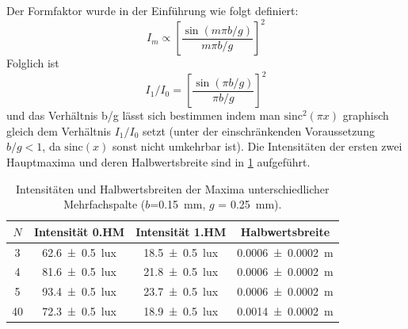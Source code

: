 \documentclass[
	a4paper,
	12pt,
	pagesize,
	ngerman
]{scrartcl}
\begin{document}
	

	
	Der Formfaktor wurde in der Einführung wie folgt definiert: 
	\begin{equation}
		I_m \propto \left[\frac{\sin(m\pi b/g)}{m\pi b/g}\right]^2
	\end{equation}
	Folglich ist
	\begin{equation}
		I_1/I_0 = \left[\frac{\sin(\pi b/g)}{\pi b/g}\right]^2
	\end{equation}
	und das Verhältnis b/g lässt sich bestimmen indem man $ \text{sinc}^2(\pi x)$ graphisch gleich dem Verhältnis $I_1/I_0$ setzt (unter der einschränkenden Voraussetzung $b/g<1$, da $\text{sinc}(x)$ sonst nicht umkehrbar ist).
	Die Intensitäten der ersten zwei Hauptmaxima und deren Halbwertsbreite sind in \cref{GitterTabelle} aufgeführt. 
	\begin{table}[H]
		\centering
		\begin{tabular}{ c | c | c | c }
			$N$ &  Intensität 0.HM & Intensität 1.HM & Halbwertsbreite\\ \hline
			3 & \SI{62,6 +- 0,5}{lux} & \SI{18,5 +- 0,5}{lux} & \SI{0,0006+- 0,0002}{m} \\
			4 & \SI{81,6 +- 0,5}{lux} & \SI{21,8 +- 0,5}{lux} & \SI{0,0006+- 0,0002}{m} \\
			5 & \SI{93,4 +- 0,5}{lux} & \SI{23,7 +- 0,5}{lux} & \SI{0,0006+- 0,0002}{m} \\
			40& \SI{72,3 +- 0,5}{lux} & \SI{18,9 +- 0,5}{lux} & \SI{0,0014+- 0,0002}{m} \\
		\end{tabular}
		\caption{Intensitäten und Halbwertsbreiten der Maxima unterschiedlicher Mehrfachspalte ($b$=\SI{0,15}{mm}, $g$ = \SI{0,25}{mm}).}
		\label{GitterTabelle} 
	\end{table}
	
\end{document}
